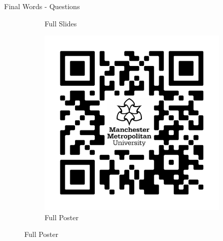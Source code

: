 \documentclass[aspectratio=169]{beamer}
\begin{document}
\begin{frame}{Final Words - Questions}
\begin{figure}
\begin{subfigure}[t]{0.3\textwidth}
            \caption{Full Slides}
            \label{fig:fw-qr2}
        \end{subfigure}
        \begin{subfigure}[t]{0.3\textwidth}
            \centering
            \includegraphics[width=\linewidth]{assets/.Global/POSTER QRCODE.png}
            \caption{Full Poster}
            \label{fig:fw-qr3}
        \end{subfigure}
        
    \end{figure}
\end{frame}
\end{document}
